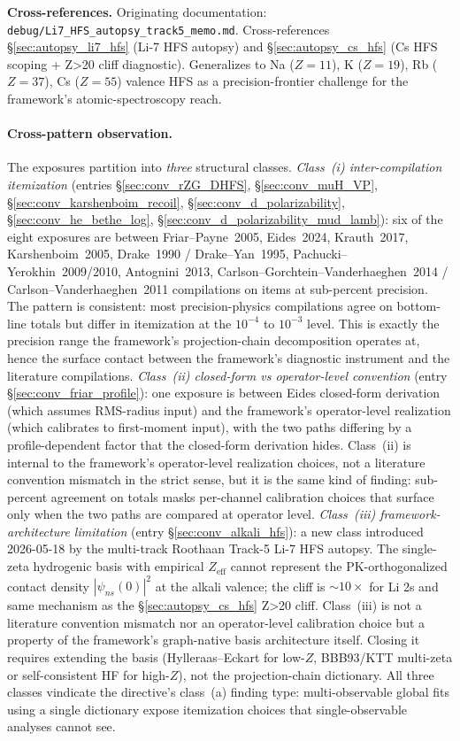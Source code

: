 \documentclass[11pt]{article}
\begin{document}
\textbf{Cross-references.}  Originating documentation:
\texttt{debug/Li7\_HFS\_autopsy\_track5\_memo.md}.  Cross-references
\S\ref{sec:autopsy_li7_hfs} (Li-7 HFS autopsy) and
\S\ref{sec:autopsy_cs_hfs} (Cs HFS scoping + Z\textgreater 20 cliff
diagnostic).  Generalizes to Na ($Z=11$), K ($Z=19$), Rb ($Z=37$),
Cs ($Z=55$) valence HFS as a precision-frontier challenge for the
framework's atomic-spectroscopy reach.

\paragraph{Cross-pattern observation.}
The exposures partition into \emph{three} structural classes.
\emph{Class~(i) inter-compilation itemization} (entries
\S\ref{sec:conv_rZG_DHFS}, \S\ref{sec:conv_muH_VP},
\S\ref{sec:conv_karshenboim_recoil}, \S\ref{sec:conv_d_polarizability},
\S\ref{sec:conv_he_bethe_log},
\S\ref{sec:conv_d_polarizability_mud_lamb}):
six of the eight exposures
are between Friar--Payne~2005, Eides~2024, Krauth~2017, Karshenboim~2005,
Drake~1990 / Drake--Yan~1995, Pachucki--Yerokhin~2009/2010,
Antognini~2013, Carlson--Gorchtein--Vanderhaeghen~2014 / Carlson--Vanderhaeghen~2011 compilations on items at
sub-percent precision.  The pattern is consistent: most precision-physics
compilations agree on bottom-line totals but differ in itemization at
the $10^{-4}$ to $10^{-3}$ level.  This is exactly the precision range
the framework's projection-chain decomposition operates at, hence the
surface contact between the framework's diagnostic instrument and
the literature compilations.  \emph{Class~(ii) closed-form vs
operator-level convention} (entry \S\ref{sec:conv_friar_profile}):
one exposure is between Eides closed-form derivation (which assumes
RMS-radius input) and the framework's operator-level realization
(which calibrates to first-moment input), with the two paths
differing by a profile-dependent factor that the closed-form
derivation hides.  Class~(ii) is internal to the framework's
operator-level realization choices, not a literature convention
mismatch in the strict sense, but it is the same kind of finding:
sub-percent agreement on totals masks per-channel calibration choices
that surface only when the two paths are compared at operator level.
\emph{Class~(iii) framework-architecture limitation} (entry
\S\ref{sec:conv_alkali_hfs}): a new class introduced
2026-05-18 by the multi-track Roothaan Track-5 Li-7 HFS autopsy.
The single-zeta hydrogenic basis with empirical $Z_\text{eff}$ cannot
represent the PK-orthogonalized contact density $|\psi_{ns}(0)|^2$ at
the alkali valence; the cliff is $\sim 10\times$ for Li 2s and same
mechanism as the \S\ref{sec:autopsy_cs_hfs} Z\textgreater 20 cliff.
Class~(iii) is not a literature convention mismatch nor an operator-level
calibration choice but a property of the framework's graph-native
basis architecture itself.  Closing it requires extending the basis
(Hylleraas--Eckart for low-$Z$, BBB93/KTT multi-zeta or self-consistent
HF for high-$Z$), not the projection-chain dictionary.
All three classes vindicate the directive's class~(a) finding type:
multi-observable global fits using a single dictionary expose
itemization choices that single-observable analyses cannot see.
\end{document}
